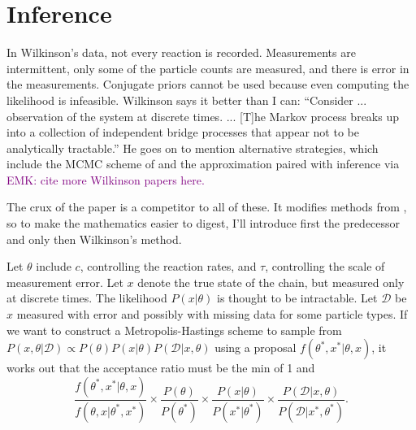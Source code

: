 \documentclass{article}
\newcommand\EMK[1]{\textcolor{purple}{EMK: #1}}
\begin{document}
\section{Inference}

In Wilkinson's data, not every reaction is recorded. Measurements are intermittent, only some of the particle counts are measured, and there is error in the measurements. Conjugate priors cannot be used because even computing the likelihood is infeasible. Wilkinson says it better than I can: ``Consider ... observation of the system at discrete times. ... [T]he Markov process breaks up into a collection of independent bridge processes that appear not to be analytically tractable.'' He goes on to mention alternative strategies, which include the MCMC scheme of \cite{Boys2008} and the approximation \cite{gillespie_CLE_2000} paired with inference via \EMK{cite more Wilkinson papers here.}


The crux of the paper is a competitor to all of these. It modifies methods from \cite{Marjoram23122003}, so to make the mathematics easier to digest, I'll introduce first the predecessor and only then Wilkinson's method. 

Let $\theta$ include $c$, controlling the reaction rates, and $\tau$, controlling the scale of measurement error. Let $x$ denote the true state of the chain, but measured only at discrete times. The likelihood $P(x|\theta)$ is thought to be intractable. Let $\mathcal{D}$ be $x$ measured with error and possibly with missing data for some particle types. If we want to construct a Metropolis-Hastings scheme to sample from $P(x, \theta|\mathcal{D})\propto P( \theta)P(x| \theta)P(\mathcal{D}|x, \theta)$ using a proposal $f(\theta^*, x^*|\theta, x)$, it works out that the acceptance ratio must be the min of 1 and $$\frac{f(\theta^*, x^*|\theta, x)}{f(\theta, x|\theta^*, x^*)}\times 
\frac{ P( \theta)}{ P( \theta^*)} \times 
\frac{P(x| \theta)}{P(x^*| \theta^*)} \times
 \frac{P(\mathcal{D}|x, \theta)}{P(\mathcal{D}|x^*, \theta^*)}.$$ 
\end{document}

